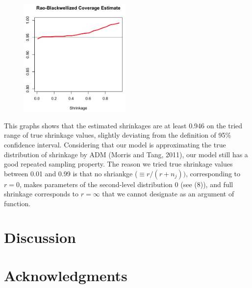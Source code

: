 \documentclass[article]{jss}
\begin{document}
\begin{CodeChunk}
\end{CodeChunk}
\begin{figure}[h]
\begin{center}
\includegraphics[width = 5.5cm]{baseball4.png}
\end{center}
\end{figure}

This graphs shows that the estimated shrinkages are at least 0.946 on the tried range of true shrinkage values, slightly deviating from the definition of 95\% confidence interval. Considering that our model is approximating the true distribution of shrinkage by ADM (Morris and Tang, 2011), our model still has a good repeated sampling property. The reason we tried true shrinkage values between 0.01 and 0.99 is that no shriankge ($\equiv r / (r + n_{j}))$, corresponding to $r=0$, makes parameters of the second-level distribution 0 (see (8)), and full shrinkage corresponds to $r=\infty$ that we cannot designate as an argument of  function.
\\

\section[Discussion]{Discussion}

\section[acknowledgments]{Acknowledgments}
\end{document}
